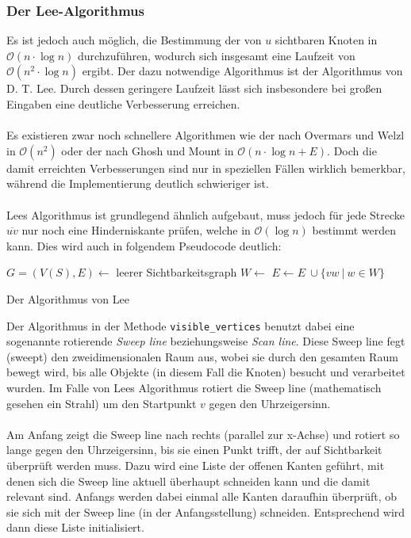\documentclass[a4paper, notitlepage, 12pt]{scrartcl}
\begin{document}
 \subsubsection{Der Lee-Algorithmus}
 Es ist jedoch auch möglich, die Bestimmung der von $u$ sichtbaren Knoten in $\mathcal{O}(n \cdot \log n)$ durchzuführen, wodurch sich insgesamt eine Laufzeit von $\mathcal{O}(n^2 \cdot \log n)$ ergibt. Der dazu notwendige Algorithmus ist der Algorithmus von D. T. Lee. Durch dessen geringere Laufzeit lässt sich insbesondere bei großen Eingaben eine deutliche Verbesserung erreichen. \\ \\
 Es existieren zwar noch schnellere Algorithmen wie der nach Overmars und Welzl in $\mathcal{O}(n^2)$ oder der nach Ghosh und Mount in $\mathcal{O}(n \cdot \log n + E)$\cite{Src:kitz}. Doch die damit erreichten Verbesserungen sind nur in speziellen Fällen wirklich bemerkbar, während die Implementierung deutlich schwieriger ist. \\ \\
 Lees Algorithmus ist grundlegend ähnlich aufgebaut, muss jedoch für jede Strecke $\overline{uv}$ nur noch eine Hinderniskante prüfen, welche in $\mathcal{O}(\log n)$ bestimmt werden kann. Dies wird auch in folgendem Pseudocode deutlich:
 \begin{algorithm}[H]
 \begin{algorithmic}
 	\State $G = (V(S),E) \gets$ leerer Sichtbarkeitsgraph
 	\State $W \gets$ 
 	\State $E \gets E~ \cup \{vw~|~w \in W \}$
 	\EndFor
 	\EndFunction
 \end{algorithmic}
 \caption{Der Algorithmus von Lee}
 \end{algorithm}
 Der Algorithmus in der Methode \texttt{visible\_vertices} benutzt dabei eine sogenannte rotierende \emph{Sweep line} beziehungsweise \emph{Scan line}. Diese Sweep line fegt (\glqq sweept\grqq) den zweidimensionalen Raum aus, wobei sie durch den gesamten Raum bewegt wird, bis alle Objekte (in diesem Fall die Knoten) besucht und verarbeitet wurden. Im Falle von Lees Algorithmus rotiert die Sweep line (mathematisch gesehen ein Strahl) um den Startpunkt $v$ gegen den Uhrzeigersinn. \\ \\
 Am Anfang zeigt die Sweep line nach rechts (parallel zur x-Achse) und rotiert so lange gegen den Uhrzeigersinn, bis sie einen Punkt trifft, der auf Sichtbarkeit überprüft werden muss. Dazu wird eine Liste der offenen Kanten geführt, mit denen sich die Sweep line aktuell überhaupt schneiden kann und die damit relevant sind.\cite{Src:pyvistwo} Anfangs werden dabei einmal alle Kanten daraufhin überprüft, ob sie sich mit der Sweep line (in der Anfangsstellung) schneiden. Entsprechend wird dann diese Liste initialisiert. \\ \\
\end{document}
